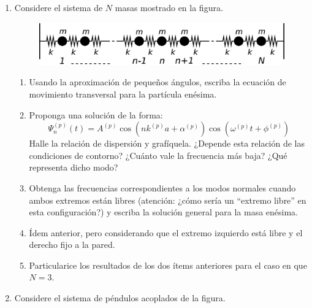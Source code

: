 \documentclass[11pt,spanish]{article}
\begin{document}
\begin{enumerate}

    \item Considere el sistema de $N$ masas mostrado en la figura. 

    \begin{figure}[H]
    \begin{centering}
        \includegraphics[clip,scale=0.25]{figs/ej1-11}
    \par\end{centering}
    \end{figure}

    \begin{enumerate}
        \item Usando la aproximación de pequeños ángulos, escriba la ecuación de
        movimiento transversal para la partícula enésima.

        \item Proponga una solución de la forma:
        \[
        \Psi_{n}^{(p)}(t)=A^{(p)}\cos\left(nk^{(p)}a+\alpha^{(p)}\right)\cos\left(\omega^{(p)}t+\phi^{(p)}\right)
        \]
        Halle la relación de dispersión y grafíquela. ¿Depende esta relación de
        las condiciones de contorno? ¿Cuánto vale la frecuencia más baja? ¿Qué
        representa dicho modo? 

        \item Obtenga las frecuencias correspondientes a los modos normales
        cuando ambos extremos están libres (atención: ¿cómo sería un ``extremo
        libre'' en esta configuración?) y escriba la solución general para la
        masa enésima. 
        
        \item Ídem anterior, pero considerando que el extremo izquierdo está
        libre y el derecho fijo a la pared.

        \item Particularice los resultados de los dos ítems anteriores para el
        caso en que $N=3$.
    \end{enumerate}


    \item Considere el sistema de péndulos acoplados de la figura. 
    

\end{enumerate}
\end{document}
